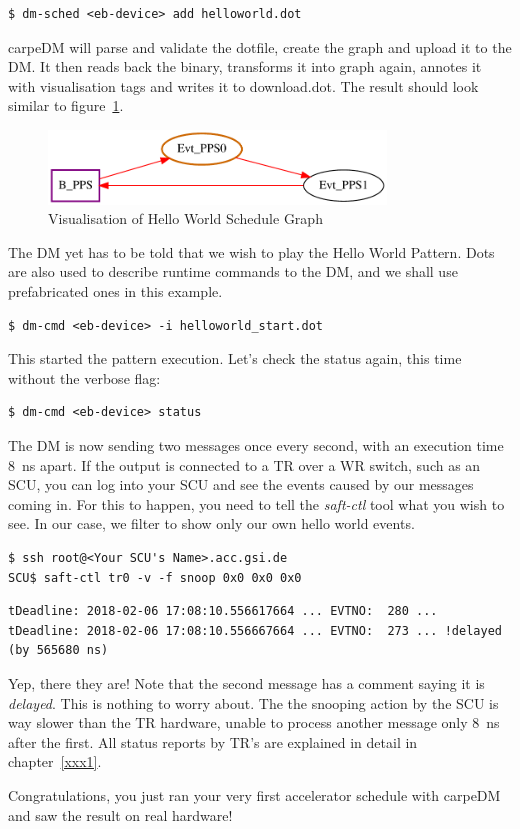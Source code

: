 \begin{lstlisting}[style = customshell]
$ dm-sched <eb-device> add helloworld.dot
\end{lstlisting}
carpeDM will parse and validate the dotfile, create the graph and upload it to the DM. It then reads back the binary, transforms it into graph again, annotes it with visualisation tags and writes it to download.dot.
The result should look similar to figure~\ref{fig:helloworld}.
%
\begin{figure}[H]
   \centering
   \def\svgwidth{0.5\textwidth}
   \includegraphics*[width=0.8\textwidth,keepaspectratio]{Figures/helloworld}
   \caption{Visualisation of Hello World Schedule Graph }
   \label{fig:helloworld}
\end{figure}
%
The DM yet has to be told that we wish to play the Hello World Pattern. Dots are also used to describe runtime commands to the DM,
and we shall use prefabricated ones in this example.
%
\begin{lstlisting}[style = customshell]
$ dm-cmd <eb-device> -i helloworld_start.dot
\end{lstlisting}
%
This started the pattern execution. Let's check the status again, this time without the verbose flag:
%
\begin{lstlisting}[style = customshell]
$ dm-cmd <eb-device> status
\end{lstlisting}
%
The DM is now sending two messages once every second, with an execution time \SI{8}{\nano\second} apart.
If the output is connected to a TR over a WR switch, such as an SCU, you can log into your SCU and see the events caused by our messages coming in.
For this to happen, you need to tell the \emph{saft-ctl} tool what you wish to see. In our case, we filter to show only our own hello world events.
%
\begin{lstlisting}[style = customshell]
$ ssh root@<Your SCU's Name>.acc.gsi.de
SCU$ saft-ctl tr0 -v -f snoop 0x0 0x0 0x0
\end{lstlisting}
%
\begin{lstlisting}[style = customshell]
tDeadline: 2018-02-06 17:08:10.556617664 ... EVTNO:  280 ...
tDeadline: 2018-02-06 17:08:10.556667664 ... EVTNO:  273 ... !delayed (by 565680 ns)
\end{lstlisting}
%
Yep, there they are! Note that the second message has a comment saying it is \emph{delayed}.
This is nothing to worry about. The the snooping action by the SCU is way slower than the TR hardware, unable to process another message only \SI{8}{\nano\second} after the first.
All status reports by TR's are explained in detail in chapter~\ref{xxx1}.
\par
\noindent
Congratulations, you just ran your very first accelerator schedule with carpeDM and saw the result on real hardware!









